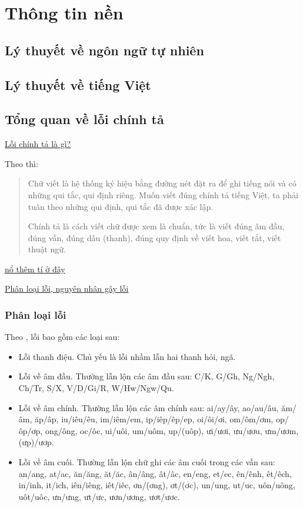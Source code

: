 \documentclass[a4paper,oneside]{book} %
\newcommand{\note}[1]{\underline{#1}}
\begin{document}
\chapter{Thông tin nền}
\label{cha:background}


\section{Lý thuyết về ngôn ngữ tự nhiên}
\label{sec:natural-language}

\section{Lý thuyết về tiếng Việt}
\label{sec:Vietnamese}



\section{Tổng quan về lỗi chính tả}

\note{Lỗi chính tả là gì?}

Theo \cite{LoiChinhTa} thì:
\begin{verse}
  Chữ viết là hệ thống ký hiệu bằng đường nét đặt ra để ghi tiếng nói
  và có những qui tắc, qui định riêng. Muốn viết đúng chính tả tiếng
  Việt, ta phải tuân theo những qui định, qui tắc đã được xác lập.

  Chính tả là cách viết chữ được xem là chuẩn, tức là viết đúng âm
  đầu, đúng vần, đúng dấu (thanh), đúng quy định về viết hoa, viết
  tắt, viết thuật ngữ.
\end{verse}

\note{nổ thêm tí ở đây}

\note{Phân loại lỗi, nguyên nhân gây lỗi}

\subsection{Phân loại lỗi}

Theo \cite{LoiChinhTa}, lỗi bao gồm các loại sau:
\begin{itemize}
\item Lỗi thanh điệu. Chủ yếu là lỗi nhầm lẫn hai thanh hỏi, ngã.
\item Lỗi về âm đầu. Thường lẫn lộn các âm đầu sau: C/K, G/Gh, Ng/Ngh,
  Ch/Tr, S/X, V/D/Gi/R, W/Hw/Ngw/Qu.
\item Lỗi về âm chính. Thường lẫn lộn các âm chính sau: ai/ay/ây,
  ao/au/âu, ăm/âm, ăp/âp, iu/iêu/êu, im/iêm/em, ip/iêp/êp/ep,
  oi/ôi/ơi, om/ôm/ơm, op/ôp/ơp, ong/ông, oc/ôc, ui/uôi, um/uôm, up/(uôp),
  ưi/ươi, ưu/ươu, ưm/ươm, (ưp)/ươp.
\item Lỗi về âm cuối. Thường lẫn lộn chữ ghi các âm cuối trong các vần
  sau:
  an/ang, at/ac, ăn/ăng, ăt/ăc, ân/âng, ât/âc, en/eng, et/ec, ên/ênh,
  êt/êch, in/inh, it/ich, iên/iêng, iêt/iêc, ơn/(ơng), ơt/(ơc),
  un/ung, ut/uc, uôn/uông, uôt/uôc, ưn/ưng, ưt/ưc, ươn/ương, ươt/ươc.
\end{itemize}
\end{document}
